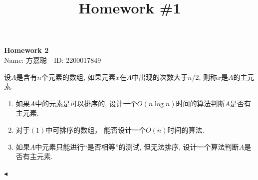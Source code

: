 \documentclass[11pt]{article}
\title{Homework \#1}
\newenvironment{problem}[2][Problem]{\begin{trivlist}
\item[\hskip \labelsep{\bfseries#1}\hskip\labelsep{\bfseries#2.}]}{\hfill$\blacktriangleleft$\end{trivlist}}
\begin{document}
\kaishu

\pagestyle{fancy}
\chead{}

\begin{center}
    {\LARGE \bf Homework 2}\\
    {Name: 方嘉聪\ \  ID: 2200017849}            %
\end{center}

\begin{problem}{1 (Textbook 2.7)}
    设$A$是含有$n$个元素的数组, 如果元素$x$在$A$中出现的次数大于$n/2$, 则称$x$是$A$的主元素.
    \begin{enumerate}[label =(\arabic*)]
        \item 如果$A$中的元素是可以排序的, 设计一个$O(n \log n)$时间的算法判断$A$是否有主元素.
        \item 对于$(1)$中可排序的数组， 能否设计一个$O(n)$时间的算法.
        \item 如果$A$中元素只能进行“是否相等”的测试, 但无法排序, 设计一个算法判断$A$是否有主元素.
    \end{enumerate}
\end{problem}
\end{document}
